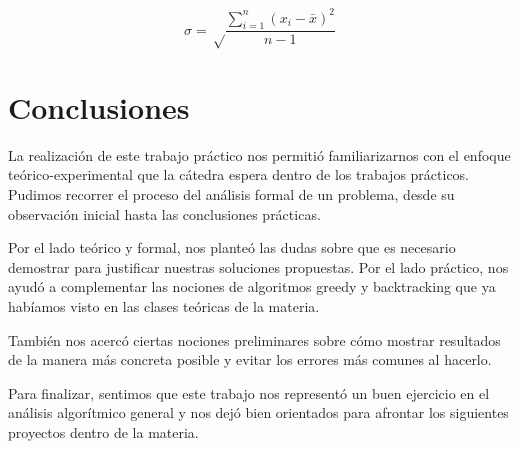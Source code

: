 \documentclass[10pt,a4paper]{article}
\begin{document}
\begin{equation} 
\sigma = \sqrt \frac{\sum\limits_{i=1}^{n}
  \left(x_{i} - \bar{x}\right)^{2}}
  {n-1}
\end{equation}

\newpage


\newpage


\newpage


\newpage

\section{Conclusiones}

La realización de este trabajo práctico nos permitió familiarizarnos con el enfoque teórico-experimental que la cátedra espera dentro de los trabajos prácticos. Pudimos recorrer el proceso del análisis formal de un problema, desde su observación inicial hasta las conclusiones prácticas. 

Por el lado teórico y formal, nos planteó las dudas sobre que es necesario demostrar para justificar nuestras soluciones propuestas. Por el lado práctico, nos ayudó a complementar las nociones de algoritmos greedy y backtracking que ya habíamos visto en las clases teóricas de la materia.

También nos acercó ciertas nociones preliminares sobre cómo mostrar resultados de la manera más concreta posible y evitar los errores más comunes al hacerlo.

Para finalizar, sentimos que este trabajo nos representó un buen ejercicio en el análisis algorítmico general y nos dejó bien orientados para afrontar los siguientes proyectos dentro de la materia.
\end{document}
